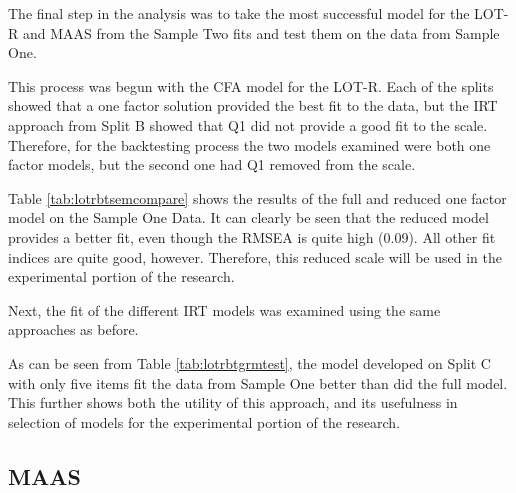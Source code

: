 \documentclass{article}
\begin{document}
The final step in the analysis was to take the most successful model for the LOT-R and MAAS from the Sample Two fits and test them on the data from Sample One. 

This process was begun with the CFA model for the LOT-R. Each of the splits showed that a one factor solution provided the best fit to the data, but the IRT approach from Split B showed that Q1 did not provide a good fit to the scale. Therefore, for the backtesting process the two models examined were both one factor models, but the second one had Q1 removed from the scale.



\begin{table}[ht]
\centering
{}
\caption{Performance of Full and Reduced Model for LOT-R on Sample One Data} 
\label{tab:lotrbtsemcompare}
\end{table}
Table \ref{tab:lotrbtsemcompare} shows the results of the full and reduced one factor model on the Sample One Data. It can clearly be seen that the reduced model provides a better fit, even though the RMSEA is quite high (0.09). All other fit indices are quite good, however. Therefore, this reduced scale will be used in the experimental portion of the research. 

Next, the fit of the different IRT models was examined using the same approaches as before. 



As can be seen from Table \ref{tab:lotrbtgrmtest}, the model developed on Split C with only five items fit the data from Sample One better than did the full model. This further shows both the utility of this approach, and its usefulness in selection of models for the experimental portion of the research. 

\subsection{MAAS}
\label{sec:maas-1}
\end{document}
